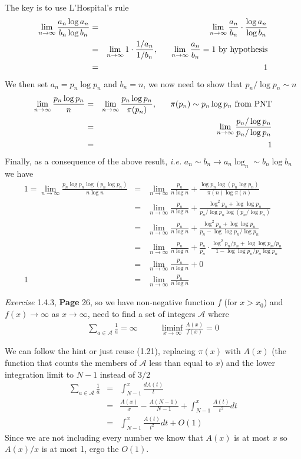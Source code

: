 \documentclass[aps,preprint,preprintnumbers,nofootinbib,showpacs,prd]{revtex4-1}
\newcommand{\ie}{{\it i.e.} }
\newcommand{\nbea}{\begin{eqnarray*}}
\newcommand{\neea}{\end{eqnarray*}}
\begin{document}
The key is to use L'Hospital's rule
%
\nbea
\lim_{n\to\infty} \frac{a_n\log a_n}{b_n\log b_n} & = & \lim_{n\to\infty} \frac{a_n}{b_n} \cdot \frac{\log a_n}{\log b_n} \\
& = & \lim_{n\to\infty} 1 \cdot \frac{1/a_n}{1/b_n}, ~~~~~  \lim_{n\to\infty} \frac{a_n}{b_n} = 1 {\rm~by~hypothesis}\\
& = & 1
\neea
%
We then set $a_n = p_n\log p_n$ and $b_n = n$, we now need to show that $p_n/\log p_n \sim n$
%
\nbea
\lim_{n\to\infty}\frac{p_n\log p_n}{n} & = & \lim_{n\to\infty}\frac{p_n\log p_n}{\pi(p_n)}, ~~~~~ \pi(p_n) \sim p_n\log p_n {\rm~from~PNT} \\
& = & \lim_{n\to\infty}\frac{p_n/\log p_n}{p_n/\log p_n} \\
& = & 1
\neea
%
Finally, as a consequence of the above result, \ie $a_n \sim b_n \to a_n\log _n \sim b_n \log b_n$ we have
%
\nbea
1 = \lim_{n\to\infty}\frac{p_n\log p_n\log(p_n\log p_n)}{n\log n} & = & \lim_{n\to\infty}\frac{p_n}{n\log n} + \frac{\log p_n\log(p_n\log p_n)}{\pi(n)\log \pi(n)} \\
& = & \lim_{n\to\infty}\frac{p_n}{n\log n} + \frac{\log^2 p_n + \log \log p_n}{p_n/\log p_n \log (p_n/\log p_n)} \\
& = & \lim_{n\to\infty}\frac{p_n}{n\log n} + \frac{\log^2 p_n + \log \log p_n}{p_n - \log \log p_n/\log p_n} \\
& = & \lim_{n\to\infty}\frac{p_n}{n\log n} + \frac{p_n}{p_n}\cdot\frac{\log^2 p_n/p_n + \log \log p_n/p_n}{1 - \log \log p_n/p_n\log p_n} \\
& = & \lim_{n\to\infty}\frac{p_n}{n\log n} + 0 \\
1 & = & \lim_{n\to\infty}\frac{p_n}{n\log n}
\neea
%

{\it Exercise} 1.4.3, {\bf Page} 26, so we have non-negative function $f$ (for $x > x_0$) and $f(x)\to\infty$ as $x\to\infty$, need to find a set of integers $\mathcal{A}$ where
%
\nbea
\sum_{a\in\mathcal{A}} \frac{1}{a} = \infty ~~~~~~~~~~~~ \liminf_{x\to\infty}\frac{A(x)}{f(x)} = 0
\neea
%

We can follow the hint or just reuse (1.21), replacing $\pi(x)$ with $A(x)$ (the function that counts the members of $\mathcal{A}$ less than equal to $x$) and the lower integration limit to $N-1$ instead of $3/2$
%
\nbea
\sum_{a\in\mathcal{A}} \frac{1}{a} & = & \int_{N-1}^{x} \frac{dA(t)}{t} \\
& = & \frac{A(x)}{x} - \frac{A(N-1)}{N-1} + \int_{N-1}^x \frac{A(t)}{t^2}dt \\
& = & \int_{N-1}^x \frac{A(t)}{t^2}dt + O(1)
\neea
%
Since we are not including every number we know that $A(x)$ is at most $x$ so $A(x)/x$ is at most 1, ergo the $O(1)$.
\end{document}
